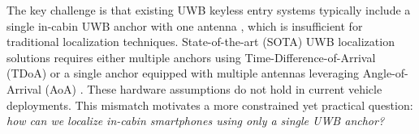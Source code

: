 \documentclass[sigconf]{acmart}
\begin{document}
The key challenge is that existing UWB keyless entry systems typically include a single in-cabin UWB anchor with one antenna \cite{Ultra-WidebandCCC, tesla_fcc_2021}, which is insufficient for traditional localization techniques.
%
State-of-the-art (SOTA) UWB localization solutions requires either multiple anchors using Time-Difference-of-Arrival (TDoA) 
\cite{chantaweesomboon2016performance,kempke2016surepoint,tiemann2016atlas} 
or a single anchor equipped with multiple antennas leveraging Angle-of-Arrival (AoA) 
\cite{ge2021single,cao2020accurate,arun2023xrloc,zhao2021uloc}. 
%
%
These hardware assumptions do not hold in current vehicle deployments.
%
This mismatch motivates a more constrained yet practical question: \textit{how can we localize in-cabin smartphones using only a single UWB anchor?}


\end{document}
